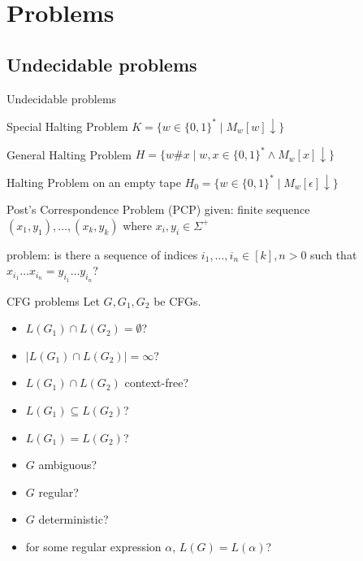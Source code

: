 \documentclass{beamer}
\theoremstyle{definition}
\begin{document}
\section{Problems}

\subsection{Undecidable problems}

\begin{frame}[allowframebreaks]{Undecidable problems}

\begin{block}{Special Halting Problem}
$K = \{w \in \{0,1\}^* \mid M_w[w]\downarrow\}$
\end{block}

\begin{block}{General Halting Problem}
$H = \{w\#x \mid w,x \in \{0,1\}^* \land M_w[x]\downarrow\}$
\end{block}

\begin{block}{Halting Problem on an empty tape}
$H_0 = \{w \in \{0,1\}^* \mid M_w[\epsilon]\downarrow\}$
\end{block}

\begin{block}{Post's Correspondence Problem (PCP)}
given: finite sequence $(x_1, y_1), \ldots, (x_k, y_k)$ where $x_i,y_i \in \Sigma^+$\par
problem: is there a sequence of indices $i_1,\ldots,i_n \in [k], n > 0$ such that $x_{i_1} \dots x_{i_n} = y_{i_1} \dots y_{i_n}$?
\end{block}

\framebreak

\begin{block}{CFG problems}
Let $G, G_1, G_2$ be CFGs.
\begin{itemize}
    \item $L(G_1) \cap L(G_2) = \emptyset$?
    \item $|L(G_1) \cap L(G_2)| = \infty$?
    \item $L(G_1) \cap L(G_2)$ context-free?
    \item $L(G_1) \subseteq L(G_2)$?
    \item $L(G_1) = L(G_2)$?
    \item $G$ ambiguous?
    \item $G$ regular?
    \item $G$ deterministic?
    \item for some regular expression $\alpha$, $L(G) = L(\alpha)$?
\end{itemize}
\end{block}

\end{frame}
\end{document}
